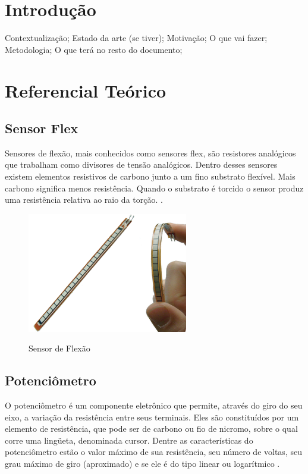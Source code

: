 \documentclass[
	12pt,				%
	openright,			%
	oneside,			%
	a4paper,			%
	english,			%
	brazil				%
	]{abntex2}
\begin{document}
\chapter{Introdução} %
		
		Contextualização; Estado da arte (se tiver); Motivação; O que vai fazer; Metodologia; O que terá no resto do documento;


	
	\chapter{Referencial Teórico}

		\section{Sensor Flex}

		Sensores de flexão, mais conhecidos como sensores flex, são resistores analógicos que trabalham como divisores de tensão analógicos. Dentro desses sensores existem elementos resistivos de carbono junto a um fino substrato flexível. Mais carbono significa menos resistência. Quando o substrato é torcido o sensor produz uma resistência relativa ao raio da torção. \cite{solanki2013sign}.

	\begin{figure}[!h]
		\centering
		\caption{Sensor de Flexão}
		\includegraphics[width=7cm,keepaspectratio=true]{./figures/flex-sensor1.png}
		\label{Fig:flex-sensor1}
	\end{figure}

		\section{Potenciômetro}
		O potenciômetro é um componente eletrônico que permite, através do giro do seu eixo, a variação da resistência entre seus terminais. Eles são constituídos por um elemento de resistência, que pode ser de carbono ou fio de nicromo, sobre o qual corre uma lingüeta, denominada cursor. Dentre as características do potenciômetro estão o valor máximo de sua resistência, seu número de voltas, seu grau máximo de giro (aproximado) e se ele é do tipo linear ou logarítmico \cite{ncb2012eletronicabasica}.
\end{document}
